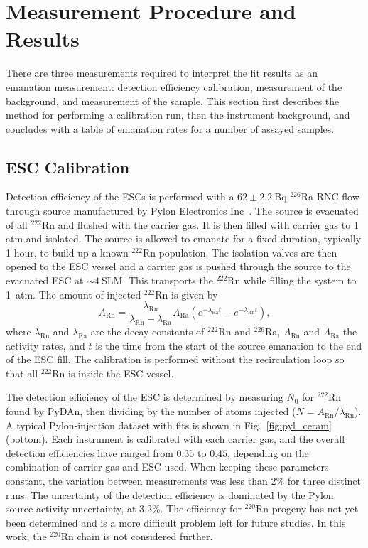 \documentclass[final,3p,times]{elsarticle}
\begin{document}
\section{Measurement Procedure and Results} 
\label{sec:measurements}
There are three measurements required to interpret the fit results as an emanation measurement: detection efficiency calibration, measurement of the background, and measurement of the sample. 
This section first describes the method for performing a calibration run, then the instrument background, and concludes with a table of emanation rates for a number of assayed samples.

\subsection{ESC Calibration}
\label{sec:esc_calib}
Detection efficiency of the ESCs is performed with a $62 \pm 2.2~\text{Bq}$ $^{226}\text{Ra}$ RNC flow-through source manufactured by Pylon Electronics Inc~\cite{pylon}. 
The source is evacuated of all $^{222}\text{Rn}$ and flushed with the carrier gas.
It is then filled with carrier gas to 1 atm and isolated. 
The source is allowed to emanate for a fixed duration, typically 1 hour, to build up a known $^{222}\text{Rn}$ population. 
The isolation valves are then opened to the ESC vessel and a carrier gas is pushed through the source to the evacuated ESC at $\sim 4~\text{SLM}$.
This transports the $^{222}\text{Rn}$ while filling the system to 1~atm.
The amount of injected $^{222}\text{Rn}$ is given by
\[ 
A_{\mathrm{Rn}} = \frac{\lambda_{\mathrm{Rn}}}{\lambda_{\mathrm{Rn}}-\lambda_{\mathrm{Ra}}} A_{\mathrm{Ra}} (e^{-\lambda_{\mathrm{Ra}}t}-e^{-\lambda_{\mathrm{Rn}}t}) ,
\]
where $\lambda_{\mathrm{Rn}}$ and $\lambda_{\mathrm{Ra}}$ are the decay constants of $^{222}\mathrm{Rn}$ and $^{226}\mathrm{Ra}$,  $A_\text{Rn}$ and $A_\text{Ra}$ the activity rates, and $t$ is the time from the start of the source emanation to the end of the ESC fill.
The calibration is performed without the recirculation loop so that all $^{222}\mathrm{Rn}$ is inside the ESC vessel.

The detection efficiency of the ESC is determined by measuring $N_0$ for $^{222}\text{Rn}$ found by PyDAn, then dividing by the number of atoms injected ($N = A_{\mathrm{Rn}} / \lambda_{\mathrm{Rn}}$).
A typical Pylon-injection dataset with fits is shown in Fig.~\ref{fig:pyl_ceram} (bottom).
Each instrument is calibrated with each carrier gas, and the overall detection efficiencies have ranged from $0.35$ to $0.45$, depending on the combination of carrier gas and ESC used.
When keeping these parameters constant, the variation between measurements was less than 2\% for three distinct runs.
The uncertainty of the detection efficiency is dominated by the Pylon source activity uncertainty, at 3.2\%. 
The efficiency for $^{220}\text{Rn}$ progeny has not yet been determined and is a more difficult problem left for future studies. 
In this work, the $^{220}\text{Rn}$ chain is not considered further. 
\end{document}
